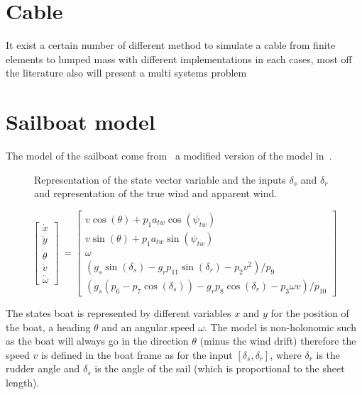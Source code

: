  \section{Cable}
 
 It exist a certain number of different method to simulate a cable from finite elements to lumped mass
 with different implementations in each cases, most off the literature also will present a multi systems
 problem 
 
 \section{Sailboat model}

The model of the sailboat come from~\cite{Melin2016} a modified version of the model in~\cite{LeBars2013}.



\begin{figure}[H]
\centering
{} %
{

}
    \caption{Representation of the state vector variable and the inputs $\delta_s$ and $\delta_r$ and representation of the true wind and apparent wind.}
    \label{fig:drawing_boat_ink}
\end{figure}


\begin{equation}
\begin{bmatrix}
\dot{x}\\
\dot{y}\\
\dot{\theta}\\
\dot{v}\\
\dot{\omega}
\end{bmatrix}\  = \begin{bmatrix}
v \cos(\theta)+p_1 a_{tw} \cos(\psi_{tw})\\
v \sin(\theta)+p_1 a_{tw} \sin(\psi_{tw})\\
\omega\\
(g_s \sin(\delta_s)-g_r p_{11} \sin(\delta_r) - p_2 v^2)/p_9\\
(g_s(p_6-p_7\cos(\delta_s))-g_r p_8 \cos(\delta_r)-p_3 \omega v)/p_{10}
\end{bmatrix}
\end{equation}


The states boat is represented by different variables $x$ and $y$ for the position of the boat, a heading $\theta$ 
and an angular speed $\omega$.
The model is non-holonomic such as the boat will always go in the direction $\theta$ (minus the wind drift) therefore the speed $v$ is defined in the boat frame as for the input $[ \delta_s , \delta_r]$, where $\delta_r$ is the rudder angle and $\delta_s$ is the angle of the sail (which is proportional to the sheet length).


